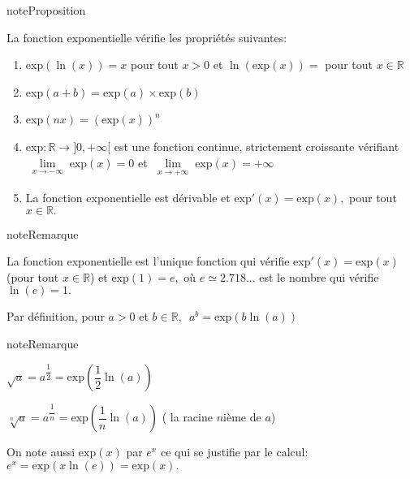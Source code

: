 \documentclass[letterpaper,10pt,french]{jupyterBook}
\begin{document}
\begin{sphinxadmonition}{note}{Proposition}

\sphinxAtStartPar
La fonction exponentielle vérifie les propriétés suivantes:
\begin{enumerate}
%
\item {} 
\sphinxAtStartPar
exp\((\ln (x))=x\) pour tout \(x>0\) et \(\ln(\mbox{exp}(x))=\) pour tout \(x\in \mathbb{R}\)

\item {} 
\sphinxAtStartPar
exp\((a+b)=\mbox{exp}(a)\times \mbox{exp}(b)\)

\item {} 
\sphinxAtStartPar
exp\((nx)=(\mbox{exp}(x))^n\)

\item {} 
\sphinxAtStartPar
exp\(:\mathbb{R}\rightarrow]0,+\infty[\) est une fonction continue, strictement croissante vérifiant \(\lim\limits_{\substack{x\rightarrow-\infty}}\mbox{exp}(x)=0\) et \(\lim\limits_{\substack{x\rightarrow+\infty}}\mbox{exp}(x)=+\infty\)

\item {} 
\sphinxAtStartPar
La fonction exponentielle est dérivable et \(\mbox{exp}'(x)=\mbox{exp}(x),\) pour tout \(x\in \mathbb{R}.\)

\end{enumerate}
\end{sphinxadmonition}

\begin{sphinxadmonition}{note}{Remarque}

\sphinxAtStartPar
La fonction exponentielle est l’unique fonction qui vérifie exp\('(x)=\)exp\((x)\) (pour tout \(x\in \mathbb{R}\)) et exp\((1)=e,\) où \(e\simeq2.718...\) est le nombre qui vérifie \(\ln (e)=1.\)

\sphinxAtStartPar
Par définition, pour \(a>0\) et \(b\in \mathbb{R},\,\) \(a^b=\mbox{exp}(b\ln (a))\)
\end{sphinxadmonition}

\begin{sphinxadmonition}{note}{Remarque}

\sphinxAtStartPar
\(\sqrt{a}=a^{\dfrac{1}{2}}=\mbox{exp}(\dfrac{1}{2}\ln (a))\)

\sphinxAtStartPar
\(\sqrt[n]{a}=a^{\dfrac{1}{n}}=\mbox{exp}(\dfrac{1}{n}\ln (a))\) ( la racine \(n\)\sphinxhyphen{}ième de \(a\))

\sphinxAtStartPar
On note aussi \(\mbox{exp}(x)\) par \(e^x\) ce qui se justifie par le calcul: \(e^x=\mbox{exp}(x\ln (e))=\mbox{exp}(x).\)
\end{sphinxadmonition}
\end{document}
